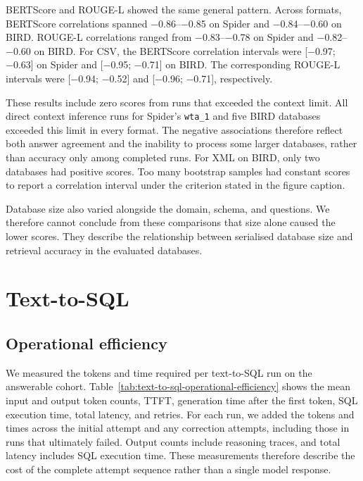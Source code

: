BERTScore and ROUGE-L showed the same general pattern. Across formats, BERTScore correlations spanned
\numrange{-0.86}{-0.85} on Spider and \numrange{-0.84}{-0.60} on BIRD. ROUGE-L correlations ranged from
\numrange{-0.83}{-0.78} on Spider and \numrange{-0.82}{-0.60} on BIRD. For CSV, the BERTScore correlation
intervals were [\num{-0.97}; \num{-0.63}] on Spider and [\num{-0.95}; \num{-0.71}] on BIRD. The corresponding
ROUGE-L intervals were [\num{-0.94}; \num{-0.52}] and [\num{-0.96}; \num{-0.71}], respectively.

These results include zero scores from runs that exceeded the context limit. All direct context inference
runs for Spider's \texttt{wta\_1} and five BIRD databases exceeded this limit in every format. The negative
associations therefore reflect both answer agreement and the inability to process some larger databases,
rather than accuracy only among completed runs. For XML on BIRD, only two databases had positive scores. Too
many bootstrap samples had constant scores to report a correlation interval under the criterion stated in the
figure caption.

Database size also varied alongside the domain, schema, and questions. We therefore cannot conclude from
these comparisons that size alone caused the lower scores. They describe the relationship between serialised
database size and retrieval accuracy in the evaluated databases.

\section{Text-to-SQL} \label{sec:text-to-sql-results}

\subsection{Operational efficiency}

We measured the tokens and time required per text-to-SQL run on the answerable cohort.
Table~\ref{tab:text-to-sql-operational-efficiency} shows the mean input and output token counts, TTFT,
generation time after the first token, SQL execution time, total latency, and retries.
For each run, we added the tokens and times across the initial attempt and any correction attempts, including
those in runs that ultimately failed. Output counts include reasoning traces, and total latency includes SQL
execution time. These measurements therefore describe the cost of the complete attempt sequence rather than a
single model response.

